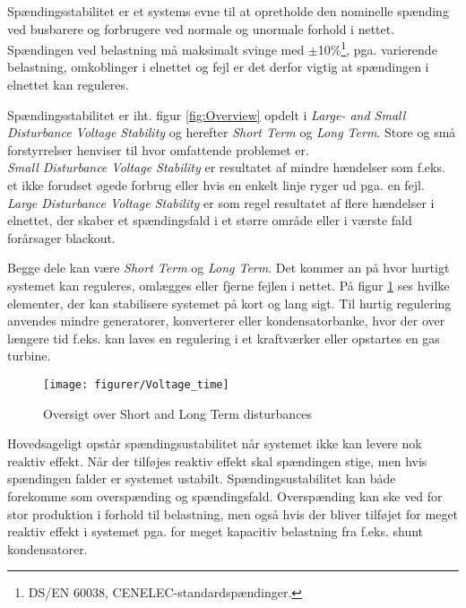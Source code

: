 
\label{Spaendingsstabilitet}

Spændingsstabilitet er et systems evne til at opretholde den nominelle spænding ved busbarere og forbrugere ved normale og unormale forhold i nettet. Spændingen ved belastning må maksimalt svinge med $\pm$10\%\footnote{DS/EN 60038, CENELEC-standardspændinger.}, pga. varierende belastning, omkoblinger i elnettet og fejl er det derfor vigtig at spændingen i elnettet kan reguleres.

Spændingsstabilitet er iht. figur \ref{fig:Overview} opdelt i \textit{Large- and Small Disturbance Voltage Stability} og herefter \textit{Short Term} og \textit{Long Term}. Store og små forstyrrelser henviser til hvor omfattende problemet er. \\
\textit{Small Disturbance Voltage Stability} er resultatet af mindre hændelser som f.eks. et ikke forudset øgede forbrug eller hvis en enkelt linje ryger ud pga. en fejl.\\
\textit{Large Disturbance Voltage Stability} er som regel resultatet af flere hændelser i elnettet, der skaber et spændingsfald i et større område eller i værste fald forårsager blackout.

Begge dele kan være \textit{Short Term} og \textit{Long Term}. Det kommer an på hvor hurtigt systemet kan reguleres, omlægges eller fjerne fejlen i nettet. På figur \ref{fig:VoltageTime} ses hvilke elementer, der kan stabilisere systemet på kort og lang sigt. Til hurtig regulering anvendes mindre generatorer, konverterer eller kondensatorbanke, hvor der over længere tid f.eks. kan laves en regulering i et kraftværker eller opstartes en gas turbine.  

\begin{figure}[H] %
	\centering
	\texttt{[image: figurer/Voltage\_time]}
	\caption{Oversigt over Short and Long Term disturbances}
	\label{fig:VoltageTime}
\end{figure}

Hovedsageligt opstår spændingsustabilitet når systemet ikke kan levere nok reaktiv effekt. Når der tilføjes reaktiv effekt skal spændingen stige, men hvis spændingen falder er systemet ustabilt. Spændingsustabilitet kan både forekomme som overspænding og spændingsfald. Overspænding kan ske ved for stor produktion i forhold til belastning, men også hvis der bliver tilføjet for meget reaktiv effekt i systemet pga. for meget kapacitiv belastning fra f.eks. shunt kondensatorer. 

